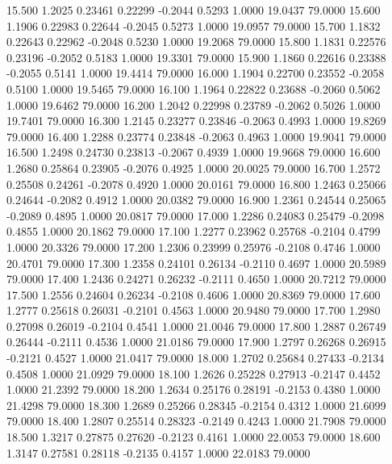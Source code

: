   15.500   1.2025   0.23461   0.22299  -0.2044   0.5293   1.0000  19.0437  79.0000
  15.600   1.1906   0.22983   0.22644  -0.2045   0.5273   1.0000  19.0957  79.0000
  15.700   1.1832   0.22643   0.22962  -0.2048   0.5230   1.0000  19.2068  79.0000
  15.800   1.1831   0.22576   0.23196  -0.2052   0.5183   1.0000  19.3301  79.0000
  15.900   1.1860   0.22616   0.23388  -0.2055   0.5141   1.0000  19.4414  79.0000
  16.000   1.1904   0.22700   0.23552  -0.2058   0.5100   1.0000  19.5465  79.0000
  16.100   1.1964   0.22822   0.23688  -0.2060   0.5062   1.0000  19.6462  79.0000
  16.200   1.2042   0.22998   0.23789  -0.2062   0.5026   1.0000  19.7401  79.0000
  16.300   1.2145   0.23277   0.23846  -0.2063   0.4993   1.0000  19.8269  79.0000
  16.400   1.2288   0.23774   0.23848  -0.2063   0.4963   1.0000  19.9041  79.0000
  16.500   1.2498   0.24730   0.23813  -0.2067   0.4939   1.0000  19.9668  79.0000
  16.600   1.2680   0.25864   0.23905  -0.2076   0.4925   1.0000  20.0025  79.0000
  16.700   1.2572   0.25508   0.24261  -0.2078   0.4920   1.0000  20.0161  79.0000
  16.800   1.2463   0.25066   0.24644  -0.2082   0.4912   1.0000  20.0382  79.0000
  16.900   1.2361   0.24544   0.25065  -0.2089   0.4895   1.0000  20.0817  79.0000
  17.000   1.2286   0.24083   0.25479  -0.2098   0.4855   1.0000  20.1862  79.0000
  17.100   1.2277   0.23962   0.25768  -0.2104   0.4799   1.0000  20.3326  79.0000
  17.200   1.2306   0.23999   0.25976  -0.2108   0.4746   1.0000  20.4701  79.0000
  17.300   1.2358   0.24101   0.26134  -0.2110   0.4697   1.0000  20.5989  79.0000
  17.400   1.2436   0.24271   0.26232  -0.2111   0.4650   1.0000  20.7212  79.0000
  17.500   1.2556   0.24604   0.26234  -0.2108   0.4606   1.0000  20.8369  79.0000
  17.600   1.2777   0.25618   0.26031  -0.2101   0.4563   1.0000  20.9480  79.0000
  17.700   1.2980   0.27098   0.26019  -0.2104   0.4541   1.0000  21.0046  79.0000
  17.800   1.2887   0.26749   0.26444  -0.2111   0.4536   1.0000  21.0186  79.0000
  17.900   1.2797   0.26268   0.26915  -0.2121   0.4527   1.0000  21.0417  79.0000
  18.000   1.2702   0.25684   0.27433  -0.2134   0.4508   1.0000  21.0929  79.0000
  18.100   1.2626   0.25228   0.27913  -0.2147   0.4452   1.0000  21.2392  79.0000
  18.200   1.2634   0.25176   0.28191  -0.2153   0.4380   1.0000  21.4298  79.0000
  18.300   1.2689   0.25266   0.28345  -0.2154   0.4312   1.0000  21.6099  79.0000
  18.400   1.2807   0.25514   0.28323  -0.2149   0.4243   1.0000  21.7908  79.0000
  18.500   1.3217   0.27875   0.27620  -0.2123   0.4161   1.0000  22.0053  79.0000
  18.600   1.3147   0.27581   0.28118  -0.2135   0.4157   1.0000  22.0183  79.0000
